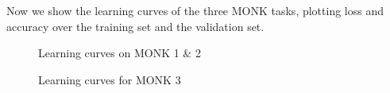 Now we show the learning curves of the three MONK tasks, plotting loss and accuracy over the training set and the validation set.

\begin{figure}
    \centering
    \caption{Learning curves on MONK 1 \& 2}
    \label{fig:monk12}
\end{figure}

\begin{figure}
    \centering    {}
    \caption{Learning curves for MONK 3}
\end{figure}

